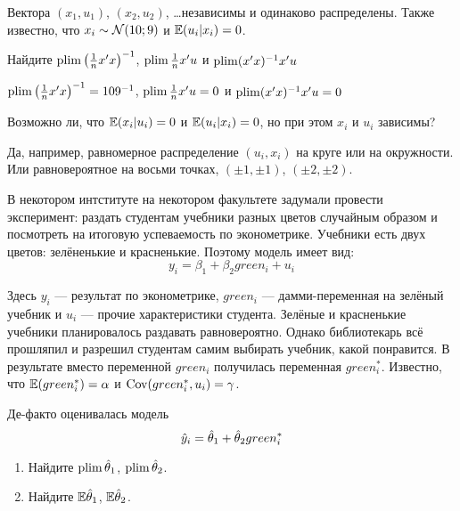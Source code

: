 \begin{problem}
Вектора $(x_1, u_1)$, $(x_2, u_2)$, \ldots независимы и одинаково распределены. Также известно, что $x_i \sim \mathcal{N}(10; 9)$ и $\mathbb{E}(u_i|x_i)=0$.

Найдите $\operatorname*{plim} \left(\frac{1}{n}x'x\right)^{-1}$, $\operatorname*{plim} \frac{1}{n}x'u$ и $\operatorname*{plim} (x'x)^{-1}x'u$
\begin{sol}
$\operatorname*{plim} \left(\frac{1}{n}x'x\right)^{-1} = 109^{-1}$, $\operatorname*{plim} \frac{1}{n}x'u = 0$ и $\operatorname*{plim} (x'x)^{-1}x'u = 0$
\end{sol}
\end{problem}


\begin{problem}
  Возможно ли, что $\mathbb{E}(x_i | u_i)=0$ и $\mathbb{E}(u_i|x_i)=0$, но при этом $x_i$ и $u_i$ зависимы?
\begin{sol}
  Да, например, равномерное распределение $(u_i, x_i)$ на круге или на окружности. Или равновероятное на восьми точках, $(\pm 1, \pm 1)$, $(\pm 2, \pm 2)$.
\end{sol}
\end{problem}


\begin{problem}
В некотором интституте на некотором факультете задумали провести эксперимент: раздать студентам учебники разных цветов случайным образом и посмотреть на итоговую успеваемость по эконометрике. Учебники есть двух цветов: зелёненькие и красненькие. Поэтому модель имеет вид:
\[
y_i = \beta_1 + \beta_2 green_i + u_i
\]

Здесь $y_i$ — результат по эконометрике, $green_i$ — дамми-переменная на зелёный учебник и $u_i$ — прочие характеристики студента. Зелёные и красненькие учебники планировалось раздавать равновероятно. Однако библиотекарь всё прошляпил и разрешил студентам самим выбирать учебник, какой понравится. В результате вместо переменной $green_i$ получилась переменная $green_i^*$. Известно, что $\mathbb{E}(green_i^*)=\alpha$ и $\operatorname{Cov}(green_i^*, u_i)=\gamma$.

Де-факто оценивалась модель
\[
\hat{y}_i = \hat \theta_1 + \hat \theta_2 green_i^*
\]

\begin{enumerate}
\item Найдите $\operatorname*{plim} \hat \theta_1$, $\operatorname*{plim} \hat \theta_2$.
\item Найдите $\mathbb{E} \hat \theta_1$, $\mathbb{E} \hat \theta_2$.
\end{enumerate}

\begin{sol}
\end{sol}
\end{problem}

